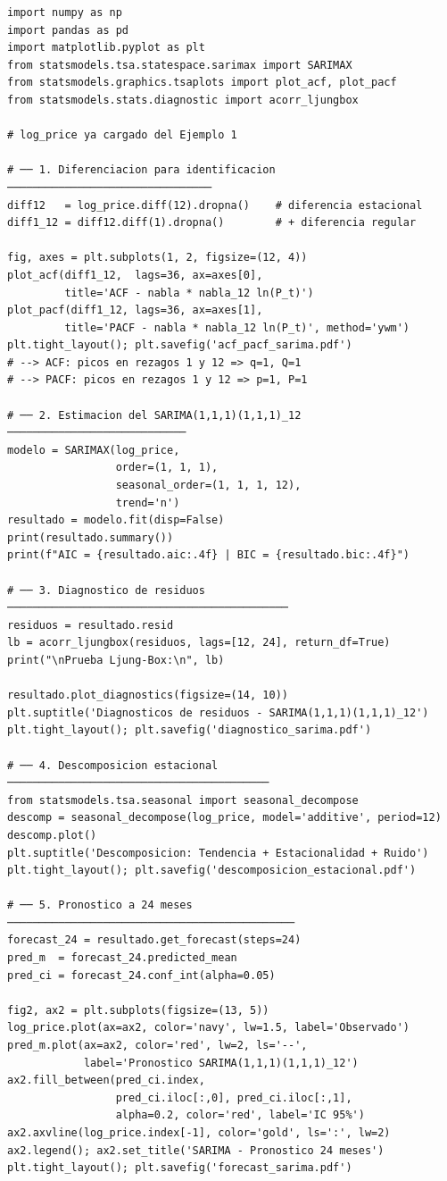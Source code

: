 \documentclass[12pt,a4paper]{article}
\begin{document}
\begin{lstlisting}[caption={Ejemplo 3 --- SARIMA(1,1,1)(1,1,1)$_{12}$},
                   label={lst:sarima}]
import numpy as np
import pandas as pd
import matplotlib.pyplot as plt
from statsmodels.tsa.statespace.sarimax import SARIMAX
from statsmodels.graphics.tsaplots import plot_acf, plot_pacf
from statsmodels.stats.diagnostic import acorr_ljungbox

# log_price ya cargado del Ejemplo 1

# ── 1. Diferenciacion para identificacion ────────────────────────────────
diff12   = log_price.diff(12).dropna()    # diferencia estacional
diff1_12 = diff12.diff(1).dropna()        # + diferencia regular

fig, axes = plt.subplots(1, 2, figsize=(12, 4))
plot_acf(diff1_12,  lags=36, ax=axes[0],
         title='ACF - nabla * nabla_12 ln(P_t)')
plot_pacf(diff1_12, lags=36, ax=axes[1],
         title='PACF - nabla * nabla_12 ln(P_t)', method='ywm')
plt.tight_layout(); plt.savefig('acf_pacf_sarima.pdf')
# --> ACF: picos en rezagos 1 y 12 => q=1, Q=1
# --> PACF: picos en rezagos 1 y 12 => p=1, P=1

# ── 2. Estimacion del SARIMA(1,1,1)(1,1,1)_12 ────────────────────────────
modelo = SARIMAX(log_price,
                 order=(1, 1, 1),
                 seasonal_order=(1, 1, 1, 12),
                 trend='n')
resultado = modelo.fit(disp=False)
print(resultado.summary())
print(f"AIC = {resultado.aic:.4f} | BIC = {resultado.bic:.4f}")

# ── 3. Diagnostico de residuos ────────────────────────────────────────────
residuos = resultado.resid
lb = acorr_ljungbox(residuos, lags=[12, 24], return_df=True)
print("\nPrueba Ljung-Box:\n", lb)

resultado.plot_diagnostics(figsize=(14, 10))
plt.suptitle('Diagnosticos de residuos - SARIMA(1,1,1)(1,1,1)_12')
plt.tight_layout(); plt.savefig('diagnostico_sarima.pdf')

# ── 4. Descomposicion estacional ─────────────────────────────────────────
from statsmodels.tsa.seasonal import seasonal_decompose
descomp = seasonal_decompose(log_price, model='additive', period=12)
descomp.plot()
plt.suptitle('Descomposicion: Tendencia + Estacionalidad + Ruido')
plt.tight_layout(); plt.savefig('descomposicion_estacional.pdf')

# ── 5. Pronostico a 24 meses ─────────────────────────────────────────────
forecast_24 = resultado.get_forecast(steps=24)
pred_m  = forecast_24.predicted_mean
pred_ci = forecast_24.conf_int(alpha=0.05)

fig2, ax2 = plt.subplots(figsize=(13, 5))
log_price.plot(ax=ax2, color='navy', lw=1.5, label='Observado')
pred_m.plot(ax=ax2, color='red', lw=2, ls='--',
            label='Pronostico SARIMA(1,1,1)(1,1,1)_12')
ax2.fill_between(pred_ci.index,
                 pred_ci.iloc[:,0], pred_ci.iloc[:,1],
                 alpha=0.2, color='red', label='IC 95%')
ax2.axvline(log_price.index[-1], color='gold', ls=':', lw=2)
ax2.legend(); ax2.set_title('SARIMA - Pronostico 24 meses')
plt.tight_layout(); plt.savefig('forecast_sarima.pdf')
\end{lstlisting}
\end{document}
